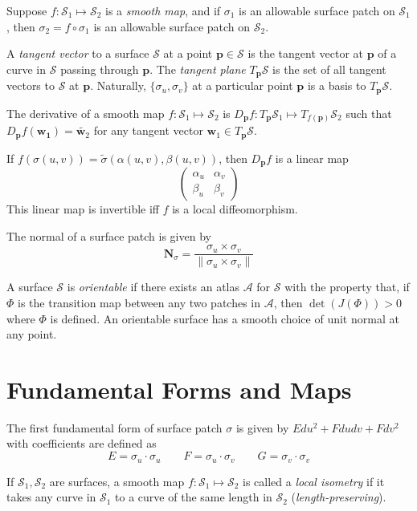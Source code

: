 \documentclass[12pt]{article}
\begin{document}
\begin{multicols*}{2}
Suppose $f : \mathcal{S}_1 \mapsto \mathcal{S}_2$ is a \textit{smooth map}, and if $\sigma_1$ is an allowable surface patch on $\mathcal{S}_1$, then $\sigma_2 = f \circ \sigma_1$ is an allowable surface patch on $\mathcal{S}_2$.

A \textit{tangent vector} to a surface $\mathcal{S}$ at a point $\mathbf{p} \in \mathcal{S}$ is the tangent vector at $\mathbf{p}$ of a curve in $\mathcal{S}$ passing through $\mathbf{p}$. The \textit{tangent plane} $T_{\mathbf{p}}\mathcal{S}$ is the set of all tangent vectors to $\mathcal{S}$ at $\mathbf{p}$. Naturally, $\{\sigma_u, \sigma_v\}$ at a particular point $\mathbf{p}$ is a basis to $T_{\mathbf{p}}\mathcal{S}$.

The derivative of a smooth map $f : \mathcal{S}_1 \mapsto \mathcal{S}_2$ is $D_{\mathbf{p}}f : T_{\mathbf{p}}\mathcal{S}_1 \mapsto T_{f(\mathbf{p})}\mathcal{S}_2$ such that $D_{\mathbf{p}}f(\mathbf{w_1}) = \tilde{\mathbf{w}_2}$ for any tangent vector $\mathbf{w}_1 \in T_{\mathbf{p}}\mathcal{S}$. 

If $f(\sigma(u, v)) = \tilde{\sigma}(\alpha(u, v), \beta(u, v))$, then $D_{\mathbf{p}}f$ is a linear map \[\left(\begin{array}{cc}
\alpha_u & \alpha_v \\
\beta_u & \beta_v
\end{array}\right)\] This linear map is invertible iff $f$ is a local diffeomorphism.

The normal of a surface patch is given by \[\mathbf{N}_{\sigma} = \frac{\sigma_u \times \sigma_v}{\lVert \sigma_u \times \sigma_v \rVert}\]

A surface $\mathcal{S}$ is \textit{orientable} if there exists an atlas $\mathcal{A}$ for $\mathcal{S}$ with the property that, if $\Phi$ is the transition map between any two patches in $\mathcal{A}$, then $\det(J(\Phi)) > 0$ where $\Phi$ is defined. An orientable surface has a smooth choice of unit normal at any point.

\section*{Fundamental Forms and Maps}

The first fundamental form of surface patch $\sigma$ is given by $Edu^2 + F dudv + Fdv^2$ with coefficients are defined as \[E = \sigma_u \cdot \sigma_u \qquad F = \sigma_u \cdot \sigma_v \qquad G = \sigma_v \cdot \sigma_v\]

If $\mathcal{S}_1, \mathcal{S}_2$ are surfaces, a smooth map $f : \mathcal{S}_1 \mapsto \mathcal{S}_2$ is called a \textit{local isometry} if it takes any curve in $\mathcal{S}_1$ to a curve of the same length in $\mathcal{S}_2$ (\textit{length-preserving}).


\end{multicols*}
\end{document}

